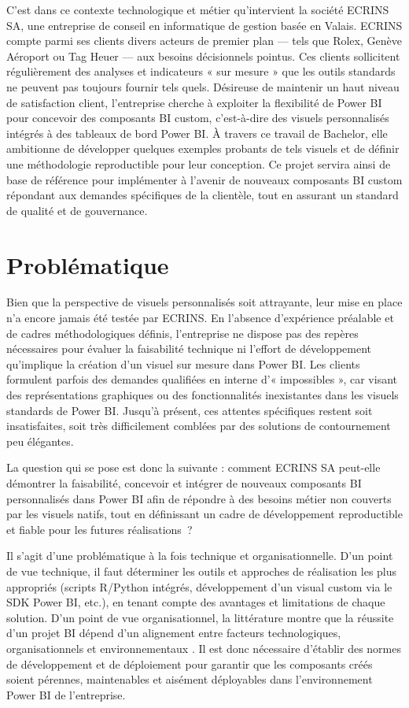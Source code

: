 C’est dans ce contexte technologique et métier qu’intervient la société ECRINS SA, une entreprise de conseil en informatique de gestion basée en Valais. ECRINS compte parmi ses clients divers acteurs de premier plan — tels que Rolex, Genève Aéroport ou Tag Heuer — aux besoins décisionnels pointus. Ces clients sollicitent régulièrement des analyses et indicateurs « sur mesure » que les outils standards ne peuvent pas toujours fournir tels quels. Désireuse de maintenir un haut niveau de satisfaction client, l’entreprise cherche à exploiter la flexibilité de Power BI pour concevoir des composants BI custom, c’est-à-dire des visuels personnalisés intégrés à des tableaux de bord Power BI. À travers ce travail de Bachelor, elle ambitionne de développer quelques exemples probants de tels visuels et de définir une méthodologie reproductible pour leur conception. Ce projet servira ainsi de base de référence pour implémenter à l’avenir de nouveaux composants BI custom répondant aux demandes spécifiques de la clientèle, tout en assurant un standard de qualité et de gouvernance.  

\section{Problématique}

Bien que la perspective de visuels personnalisés soit attrayante, leur mise en place n’a encore jamais été testée par ECRINS. En l’absence d’expérience préalable et de cadres méthodologiques définis, l’entreprise ne dispose pas des repères nécessaires pour évaluer la faisabilité technique ni l’effort de développement qu’implique la création d’un visuel sur mesure dans Power BI. Les clients formulent parfois des demandes qualifiées en interne d’« impossibles », car visant des représentations graphiques ou des fonctionnalités inexistantes dans les visuels standards de Power BI. Jusqu’à présent, ces attentes spécifiques restent soit insatisfaites, soit très difficilement comblées par des solutions de contournement peu élégantes.  

La question qui se pose est donc la suivante : comment ECRINS SA peut-elle démontrer la faisabilité, concevoir et intégrer de nouveaux composants BI personnalisés dans Power BI afin de répondre à des besoins métier non couverts par les visuels natifs, tout en définissant un cadre de développement reproductible et fiable pour les futures réalisations~?

Il s’agit d’une problématique à la fois technique et organisationnelle. D’un point de vue technique, il faut déterminer les outils et approches de réalisation les plus appropriés (scripts R/Python intégrés, développement d’un visual custom via le SDK Power BI, etc.), en tenant compte des avantages et limitations de chaque solution. D’un point de vue organisationnel, la littérature montre que la réussite d’un projet BI dépend d’un alignement entre facteurs technologiques, organisationnels et environnementaux \parencite{AlKharusi2023}. Il est donc nécessaire d’établir des normes de développement et de déploiement pour garantir que les composants créés soient pérennes, maintenables et aisément déployables dans l’environnement Power BI de l’entreprise.

